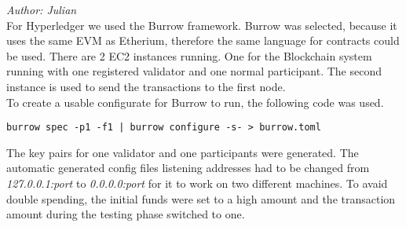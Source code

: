 \textit{Author: Julian} \\
For Hyperledger we used the Burrow framework. Burrow was selected, because it uses the same EVM as Etherium, 
therefore the same language for contracts could be used. There are 2 EC2 instances running. One for the Blockchain system
running with one registered validator and one normal participant. The second instance is used to send the
transactions to the first node. \\
To create a usable configurate for Burrow to run, the following code was used.
\begin{lstlisting}[frame=single]
    burrow spec -p1 -f1 | burrow configure -s- > burrow.toml
\end{lstlisting}
The key pairs for one validator and one participants were generated.
The automatic generated config files listening addresses had to be changed from \textit{127.0.0.1:port} to \textit{0.0.0.0:port}
for it to work on two different machines. To avaid double spending, the initial funds were set to a high amount and the transaction
amount during the testing phase switched to one.